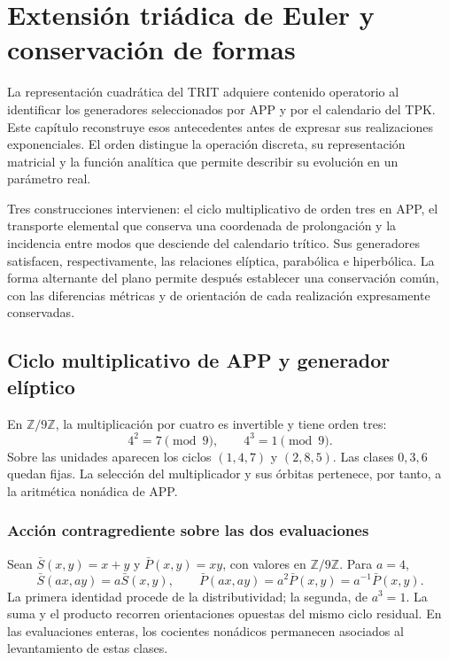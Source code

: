 \section{Extensión triádica de Euler y conservación de formas}
\label{eul:capitulo}

La representación cuadrática del TRIT adquiere contenido operatorio al
identificar los generadores seleccionados por APP y por el calendario del
TPK. Este capítulo reconstruye esos antecedentes antes de expresar sus
realizaciones exponenciales. El orden distingue la operación discreta,
su representación matricial y la función analítica que permite describir
su evolución en un parámetro real.

Tres construcciones intervienen: el ciclo multiplicativo de orden tres
en APP, el transporte elemental que conserva una coordenada de
prolongación y la incidencia entre modos que desciende del calendario
trítico. Sus generadores satisfacen, respectivamente, las relaciones
elíptica, parabólica e hiperbólica. La forma alternante del plano permite
después establecer una conservación común, con las diferencias métricas
y de orientación de cada realización expresamente conservadas.

\subsection{Ciclo multiplicativo de APP y generador elíptico}
\label{eul:coxeter}

En \(\mathbb Z/9\mathbb Z\), la multiplicación por cuatro es invertible
y tiene orden tres:
\[
 4^2=7\pmod9,\qquad 4^3=1\pmod9.
\]
Sobre las unidades aparecen los ciclos \((1,4,7)\) y \((2,8,5)\).
Las clases \(0,3,6\) quedan fijas. La selección del multiplicador y sus
órbitas pertenece, por tanto, a la aritmética nonádica de APP.

\subsubsection{Acción contragrediente sobre las dos evaluaciones}

Sean \(\bar S(x,y)=x+y\) y \(\bar P(x,y)=xy\), con valores en
\(\mathbb Z/9\mathbb Z\). Para \(a=4\),
\begin{equation}
 \bar S(ax,ay)=a\bar S(x,y),\qquad
 \bar P(ax,ay)=a^2\bar P(x,y)=a^{-1}\bar P(x,y).
\label{eul:eq:contragrediente}
\end{equation}
La primera identidad procede de la distributividad; la segunda, de
\(a^3=1\). La suma y el producto recorren orientaciones opuestas del
mismo ciclo residual. En las evaluaciones enteras, los cocientes
nonádicos permanecen asociados al levantamiento de estas clases.

